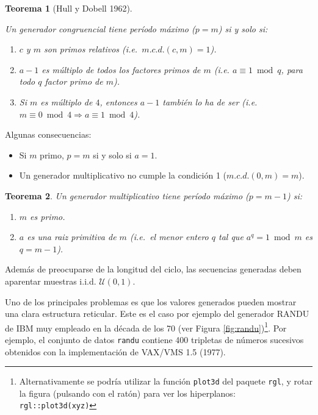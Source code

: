 \documentclass[
]{book}
\theoremstyle{break}
\newtheorem{theorem}{Teorema}[chapter]
\theoremstyle{nonumberplain}
\begin{document}
\begin{theorem}[Hull y Dobell 1962]
\protect\hypertarget{thm:hull-dobell}{}\label{thm:hull-dobell}

Un generador congruencial tiene período máximo (\(p=m\)) si y solo si:

\begin{enumerate}
\def\labelenumi{\arabic{enumi}.}
\item
  \(c\) y \(m\) son primos relativos (i.e.~\(m.c.d.(c, m) = 1\)).
\item
  \(a-1\) es múltiplo de todos los factores primos de \(m\) (i.e.
  \(a \equiv 1 \bmod q\), para todo \(q\) factor primo de \(m\)).
\item
  Si \(m\) es múltiplo de \(4\), entonces \(a-1\) también lo ha de
  ser (i.e.~\(m \equiv 0 \bmod 4\Rightarrow a \equiv 1 \bmod 4\)).
\end{enumerate}

\end{theorem}

Algunas consecuencias:

\begin{itemize}
\item
  Si \(m\) primo, \(p=m\) si y solo si \(a=1\).
\item
  Un generador multiplicativo no cumple la condición 1 (\(m.c.d.(0, m)=m\)).
\end{itemize}

\begin{theorem}

Un generador multiplicativo tiene período máximo (\(p=m-1\)) si:

\begin{enumerate}
\def\labelenumi{\arabic{enumi}.}
\item
  \(m\) es primo.
\item
  \(a\) es una raiz primitiva de \(m\) (i.e.~el menor entero \(q\) tal
  que \(a^{q}=1 \bmod m\) es \(q=m-1\)).
\end{enumerate}

\end{theorem}

Además de preocuparse de la longitud del ciclo, las secuencias generadas deben aparentar muestras i.i.d. \(\mathcal{U}(0,1)\).

Uno de los principales problemas es que los valores generados pueden mostrar una clara estructura reticular.
Este es el caso por ejemplo del generador RANDU de IBM muy empleado en la década de los 70 (ver Figura \ref{fig:randu})\footnote{Alternativamente se podría utilizar la función \texttt{plot3d} del paquete \texttt{rgl}, y rotar la figura (pulsando con el ratón) para ver los hiperplanos:
  \texttt{rgl::plot3d(xyz)}}.
Por ejemplo, el conjunto de datos \texttt{randu} contiene 400 tripletas de números sucesivos obtenidos con la implementación de VAX/VMS 1.5 (1977).
\end{document}
